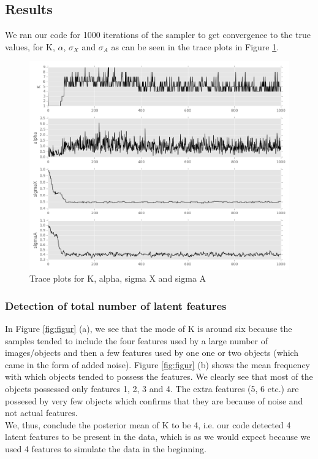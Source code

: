 \documentclass[11pt]{article}
\begin{document}
\subsection{Results}
We ran our code for 1000 iterations of the sampler to get convergence to the true values, for K, $\alpha$, $\sigma_{X}$ and $\sigma_{A}$ as can be seen in the trace plots in Figure \ref{fig:darr}.

\begin{figure}
\includegraphics[width=\linewidth]{data_files/trace_plots.png}
\caption {Trace plots for K, alpha, sigma X and sigma A}
\label{fig:darr}
\end{figure}

\subsubsection{Detection of total number of latent features}
In Figure \ref{fig:figur} (a), we see that the mode of K is around six because the samples tended to include the four features used by a large number of images/objects and then a few features used by one one or two objects (which came in the form of added noise). Figure \ref{fig:figur} (b) shows the mean frequency with which objects tended to possess the features. We clearly see that most of the objects possessed only features 1, 2, 3 and 4. The extra features (5, 6 etc.) are possesed by very few objects which confirms that they are because of noise and not actual features.\\

We, thus, conclude the posterior mean of K to be 4, i.e. our code detected 4 latent features to be present in the data, which is as we would expect because we used 4 features to simulate the data in the beginning.
\end{document}
